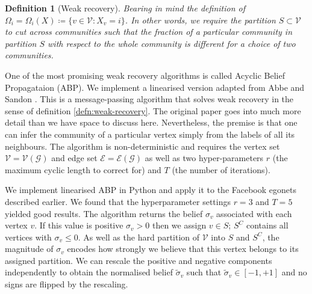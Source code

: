\documentclass[11pt]{article}
\newcommand{\Gcal}{\mathcal{G}}
\newcommand{\Vcal}{\mathcal{V}}
\newcommand{\Ecal}{\mathcal{E}}
\newtheorem{definition}{Definition}[section]
\begin{document}
\begin{multicols*}{2}
\begin{definition}[Weak recovery]
	Bearing in mind the definition of $\Omega_i = \Omega_i(X) \coloneqq \{v \in \Vcal : X_v = i\}$. In other words, we require the partition $S \subset \Vcal$ to cut across communities such that the fraction of a particular community in partition $S$ with respect to the whole community is different for a choice of two communities.  
\end{definition}


One of the most promising weak recovery algorithms is called Acyclic Belief Propagataion (ABP). We implement a linearised version adapted from Abbe and Sandon \cite{Linear-ABP}. This is a message-passing algorithm that solves weak recovery in the sense of definition \ref{defn:weak-recovery}. The original paper goes into much more detail than we have space to discuss here. Nevertheless, the premise is that one can infer the community of a particular vertex simply from the labels of all its neighbours. The algorithm is non-deterministic and requires the vertex set $\Vcal = \Vcal(\Gcal)$ and edge set $\Ecal = \Ecal(\Gcal)$ as well as two hyper-parameters $r$ (the maximum cyclic length to correct for) and $T$ (the number of iterations).

We implement linearised ABP in Python and apply it to the Facebook egonets described earlier. We found that the hyperparameter settings $r=3$ and $T=5$ yielded good results. The algorithm returns the belief $\sigma_v$ associated with each vertex $v$. If this value is positive $\sigma_v > 0$ then we assign $v \in S$; $S^C$ contains all vertices with $\sigma_v \leq 0$. As well as the hard partition of $\Vcal$ into $S$ and $S^C$, the magnitude of $\sigma_v$ encodes how strongly we believe that this vertex belongs to its assigned partition. We can rescale the positive and negative components independently to obtain the normalised belief $\tilde{\sigma}_v$ such that $\tilde{\sigma}_v \in [-1, +1]$ and no signs are flipped by the rescaling.


\end{multicols*}
\end{document}
